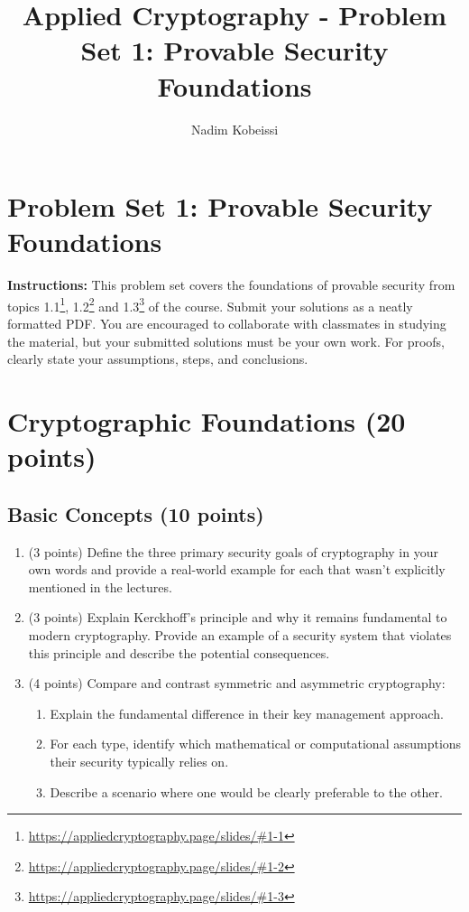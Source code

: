 \documentclass[10pt,a4paper,american]{article}
\title{Applied Cryptography - Problem Set 1: Provable Security Foundations}
\author{Nadim Kobeissi}
\begin{document}
\classhandoutheader
\section*{Problem Set 1: Provable Security Foundations}

\begin{tcolorbox}[colframe=OliveGreen!30!white,colback=OliveGreen!5!white]
	\textbf{Instructions:} This problem set covers the foundations of provable security from topics 1.1\footnote{\url{https://appliedcryptography.page/slides/\#1-1}}, 1.2\footnote{\url{https://appliedcryptography.page/slides/\#1-2}} and 1.3\footnote{\url{https://appliedcryptography.page/slides/\#1-3}} of the course. Submit your solutions as a neatly formatted PDF. You are encouraged to collaborate with classmates in studying the material, but your submitted solutions must be your own work. For proofs, clearly state your assumptions, steps, and conclusions.
\end{tcolorbox}

\section{Cryptographic Foundations (20 points)}

\subsection{Basic Concepts (10 points)}

\begin{enumerate}
	\item (3 points) Define the three primary security goals of cryptography in your own words and provide a real-world example for each that wasn't explicitly mentioned in the lectures.

	\item (3 points) Explain Kerckhoff's principle and why it remains fundamental to modern cryptography. Provide an example of a security system that violates this principle and describe the potential consequences.

	\item (4 points) Compare and contrast symmetric and asymmetric cryptography:
	      \begin{enumerate}
		      \item Explain the fundamental difference in their key management approach.
		      \item For each type, identify which mathematical or computational assumptions their security typically relies on.
		      \item Describe a scenario where one would be clearly preferable to the other.
	      \end{enumerate}
\end{enumerate}
\end{document}

